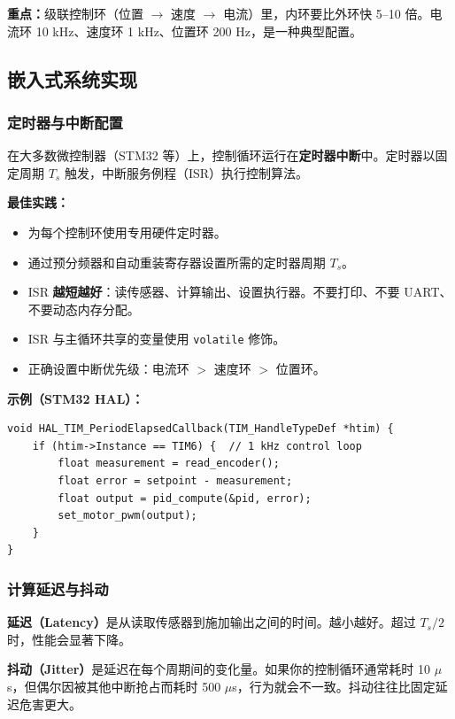 \textbf{重点：}级联控制环（位置 $\to$ 速度 $\to$ 电流）里，内环要比外环快 5--10 倍。电流环 10 kHz、速度环 1 kHz、位置环 200 Hz，是一种典型配置。

\subsection{嵌入式系统实现}

\subsubsection{定时器与中断配置}

在大多数微控制器（STM32 等）上，控制循环运行在\textbf{定时器中断}中。定时器以固定周期 $T_s$ 触发，中断服务例程（ISR）执行控制算法。

\textbf{最佳实践：}
\begin{itemize}
    \item 为每个控制环使用专用硬件定时器。
    \item 通过预分频器和自动重装寄存器设置所需的定时器周期 $T_s$。
    \item ISR \textbf{越短越好}：读传感器、计算输出、设置执行器。不要打印、不要 UART、不要动态内存分配。
    \item ISR 与主循环共享的变量使用 \texttt{volatile} 修饰。
    \item 正确设置中断优先级：电流环 $>$ 速度环 $>$ 位置环。
\end{itemize}

\textbf{示例（STM32 HAL）：}
\begin{verbatim}
void HAL_TIM_PeriodElapsedCallback(TIM_HandleTypeDef *htim) {
    if (htim->Instance == TIM6) {  // 1 kHz control loop
        float measurement = read_encoder();
        float error = setpoint - measurement;
        float output = pid_compute(&pid, error);
        set_motor_pwm(output);
    }
}
\end{verbatim}

\subsubsection{计算延迟与抖动}

\textbf{延迟（Latency）}是从读取传感器到施加输出之间的时间。越小越好。超过 $T_s / 2$ 时，性能会显著下降。

\textbf{抖动（Jitter）}是延迟在每个周期间的变化量。如果你的控制循环通常耗时 10 $\mu$s，但偶尔因被其他中断抢占而耗时 500 $\mu$s，行为就会不一致。抖动往往比固定延迟危害更大。

